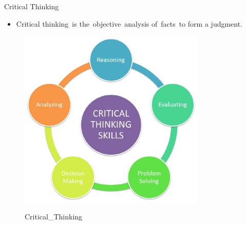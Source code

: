 \documentclass[
 size=14pt,
 paper=smartboard,  %
 mode=present, 		%
 display=slides, 	%
 style=tuliplab,  	%
 pauseslide,
 fleqn,leqno]{powerdot}{}
\begin{document}
\begin{slide}[toc=,bm=]{Critical Thinking}

\begin{itemize}
  \item Critical thinking is the objective analysis of facts to form a judgment.
\end{itemize}

\begin{figure}
  \centering
  \includegraphics[width=3.5in]{figures/Critical_Thinking.eps}\\
  \caption{Critical_Thinking}
\end{figure}

\end{slide}
\end{document}
